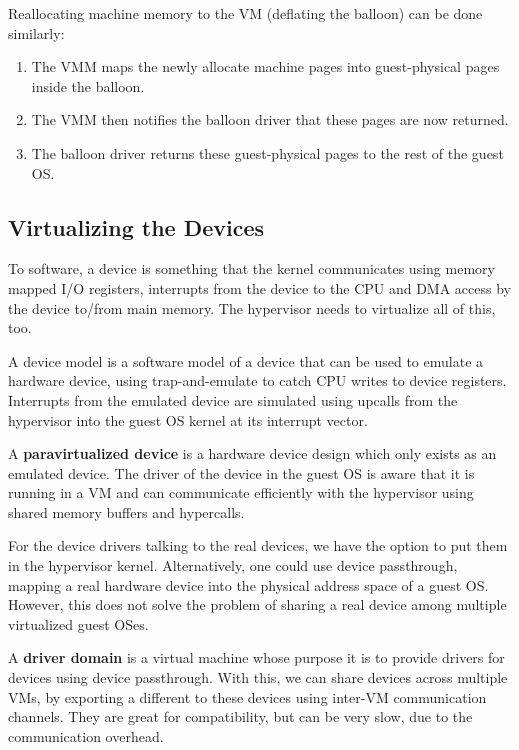 Reallocating machine memory to the VM (deflating the balloon) can be done similarly:
\begin{enumerate}
	\item The VMM maps the newly allocate machine pages into guest-physical pages inside the balloon.
	\item The VMM then notifies the balloon driver that these pages are now returned.
	\item The balloon driver returns these guest-physical pages to the rest of the guest OS.
\end{enumerate}


\subsection{Virtualizing the Devices}

To software, a device is something that the kernel communicates using memory mapped I/O registers, interrupts from the device to the CPU and DMA access by the device to/from main memory. The hypervisor needs to virtualize all of this, too.\medskip

A device model is a software model of a device that can be used to emulate a hardware device, using trap-and-emulate to catch CPU writes to device registers. Interrupts from the emulated device are simulated using upcalls from the hypervisor into the guest OS kernel at its interrupt vector.\medskip

A \textbf{paravirtualized device} is a hardware device design which only exists as an emulated device. The driver of the device in the guest OS is aware that it is running in a VM and can communicate efficiently with the hypervisor using shared memory buffers and hypercalls.\medskip

For the device drivers talking to the real devices, we have the option to put them in the hypervisor kernel. Alternatively, one could use device passthrough, mapping a real hardware device into the physical address space of a guest OS. However, this does not solve the problem of sharing a real device among multiple virtualized guest OSes.\medskip

A \textbf{driver domain} is a virtual machine whose purpose it is to provide drivers for devices using device passthrough. With this, we can share devices across multiple VMs, by exporting a different to these devices using inter-VM communication channels. They are great for compatibility, but can be very slow, due to the communication overhead.\medskip

